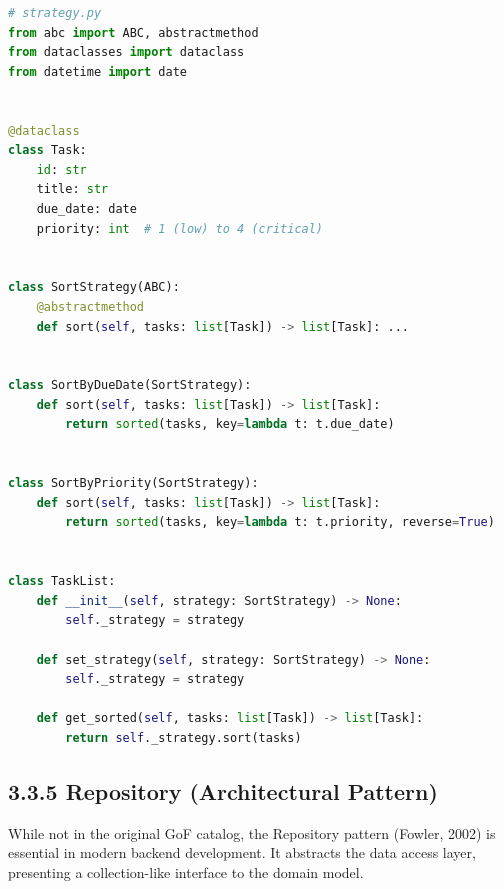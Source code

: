 \documentclass[11pt,a4paper]{book}
\begin{document}
\begin{lstlisting}[language=Python]
# strategy.py
from abc import ABC, abstractmethod
from dataclasses import dataclass
from datetime import date


@dataclass
class Task:
    id: str
    title: str
    due_date: date
    priority: int  # 1 (low) to 4 (critical)


class SortStrategy(ABC):
    @abstractmethod
    def sort(self, tasks: list[Task]) -> list[Task]: ...


class SortByDueDate(SortStrategy):
    def sort(self, tasks: list[Task]) -> list[Task]:
        return sorted(tasks, key=lambda t: t.due_date)


class SortByPriority(SortStrategy):
    def sort(self, tasks: list[Task]) -> list[Task]:
        return sorted(tasks, key=lambda t: t.priority, reverse=True)


class TaskList:
    def __init__(self, strategy: SortStrategy) -> None:
        self._strategy = strategy

    def set_strategy(self, strategy: SortStrategy) -> None:
        self._strategy = strategy

    def get_sorted(self, tasks: list[Task]) -> list[Task]:
        return self._strategy.sort(tasks)
\end{lstlisting}

\subsection{3.3.5 Repository (Architectural Pattern)}

While not in the original GoF catalog, the Repository pattern (Fowler, 2002) is essential in modern backend development. It abstracts the data access layer, presenting a collection-like interface to the domain model.
\end{document}
